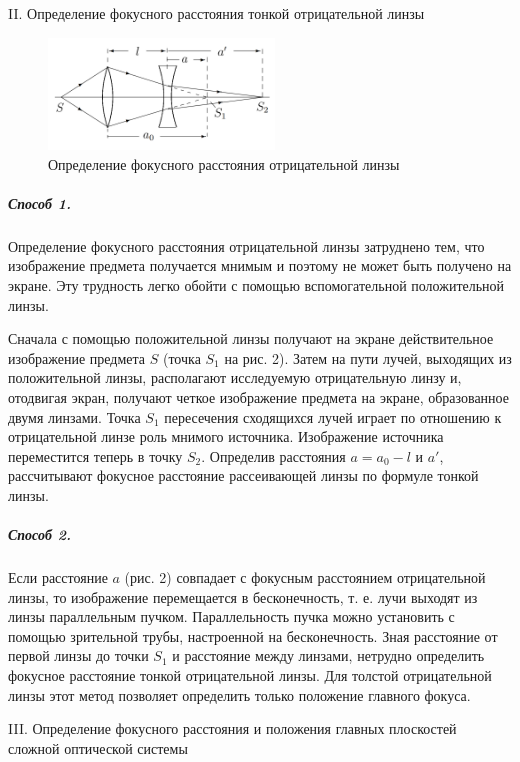 \documentclass[12pt,a4paper]{article}
\begin{document}
	\begin{center}
		II. Определение фокусного расстояния тонкой отрицательной линзы
	\end{center}

	\begin{figure}[h!]
		\centering
		\includegraphics[width=6cm]{res/negative.png}
		\caption{Определение фокусного расстояния отрицательной линзы}
	\end{figure}

	\subparagraph{Способ 1.} Определение фокусного расстояния отрицательной линзы затруднено тем, что изображение предмета получается мнимым и поэтому не может быть получено на экране. Эту трудность легко обойти с помощью вспомогательной положительной линзы.
	
	Сначала с помощью положительной линзы получают на экране действительное изображение предмета $S$ (точка $S_1$ на рис. 2). Затем на пути лучей, выходящих из положительной линзы, располагают исследуемую отрицательную линзу и, отодвигая экран, получают четкое изображение предмета на экране, образованное двумя линзами. Точка $S_1$ пересечения сходящихся лучей играет по отношению к отрицательной линзе роль мнимого источника. Изображение источника переместится теперь в точку $S_2$. Определив расстояния $a = a_0 - l$ и $a'$, рассчитывают фокусное расстояние рассеивающей линзы по формуле тонкой линзы.
	
	\subparagraph{Способ 2.} Если расстояние $a$ (рис. 2) совпадает с фокусным расстоянием отрицательной линзы, то изображение перемещается в бесконечность, т. е. лучи выходят из линзы параллельным пучком. Параллельность пучка можно установить с помощью зрительной трубы, настроенной на бесконечность. Зная расстояние от первой линзы до точки $S_1$ и расстояние между линзами, нетрудно определить фокусное расстояние тонкой отрицательной линзы. Для толстой отрицательной линзы этот метод позволяет определить только положение главного фокуса.
	
	\begin{center}
		III. Определение фокусного расстояния и положения главных плоскостей сложной оптической системы
	\end{center}
	
\end{document}
